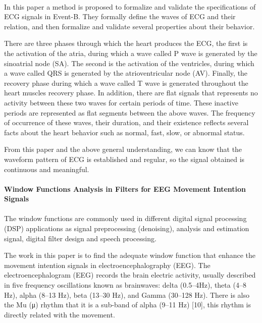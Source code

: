 \documentclass{article}
\begin{document}
\paragraph{}

In this paper a method is proposed to formalize and validate the specifications of ECG signals in Event-B. They formally define the waves of ECG and their relation, and then formalize and validate several properties about their behavior.

There are three phases through which the heart produces the ECG, the first is the activation of the atria, during which a wave called P wave is generated by the sinoatrial node (SA)\cite{ref3}. The second is the activation of the ventricles, during which a wave called QRS is generated by the atrioventricular node (AV). Finally, the recovery phase during which a wave called T wave is generated throughout the heart muscles recovery phase. In addition, there are flat signals that represents no activity between these two waves for certain periods of time. These inactive periods are represented as flat segments between the above waves. The frequency of occurrence of these waves, their duration, and their existence reflects several facts about the heart behavior such as normal, fast, slow, or abnormal status.

From this paper and the above general understanding, we can know that the waveform pattern of ECG is established and regular, so the signal obtained is continuous and meaningful.

\paragraph{Window Functions Analysis in Filters for EEG Movement Intention Signals} 

\paragraph{}

The window functions are commonly used in different digital signal processing (DSP) applications as signal preprocessing (denoising), analysis and estimation signal, digital filter design and speech processing.

The work in this paper is to find the adequate window function that enhance the movement intention signals in electroencephalography (EEG)\cite{ref4}. The electroencephalogram (EEG) records the brain electric activity, usually described in five frequency oscillations known as brainwaves: delta (0.5–4Hz), theta (4–8 Hz), alpha (8–13 Hz), beta (13–30 Hz), and Gamma (30–128 Hz). There is also the Mu (μ) rhythm that it is a sub-band of alpha (9–11 Hz) [10], this rhythm is directly related with the movement. 
\end{document}
